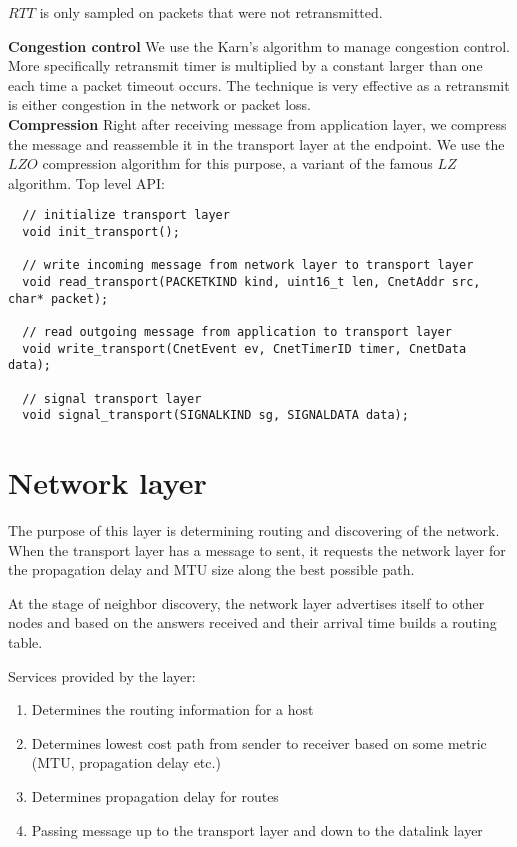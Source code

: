 \documentclass[11pt,a4paper,oneside]{report}
\begin{document}
$RTT$ is only sampled on packets that were not retransmitted. 

\noindent \textbf{Congestion control}
We use the Karn's algorithm to manage congestion control. More specifically
retransmit timer is multiplied by a constant larger than one each time a packet
timeout occurs. The technique is very effective as a retransmit is either
congestion in the network or packet loss. \\
\noindent \textbf{Compression}
Right after receiving message from application layer, we compress the message
and reassemble it in the transport layer at the endpoint. We use the $LZO$
compression algorithm for this purpose, a variant of the famous $LZ$ algorithm.
    \newpage
    Top level API:  
  \begin{lstlisting}
  // initialize transport layer 
  void init_transport();
  
  // write incoming message from network layer to transport layer
  void read_transport(PACKETKIND kind, uint16_t len, CnetAddr src, char* packet);
  
  // read outgoing message from application to transport layer
  void write_transport(CnetEvent ev, CnetTimerID timer, CnetData data);
  
  // signal transport layer
  void signal_transport(SIGNALKIND sg, SIGNALDATA data);
  \end{lstlisting}
   
\section*{Network layer} 
The purpose of this layer is determining routing and discovering of the
network. When the transport layer has a message to sent, it requests the
network layer for the propagation delay and MTU size along the best possible
path. 

At the stage of neighbor discovery, the network layer advertises itself to other
nodes and based on the answers received and their arrival time builds a routing
table.

Services provided by the layer:
\begin{enumerate}
  \item Determines the routing information for a host
  \item Determines lowest cost path from sender to receiver based on some metric
  (MTU, propagation delay etc.)
  \item Determines propagation delay for routes
  \item Passing message up to the transport layer and down to the datalink layer
\end{enumerate}
\end{document}
